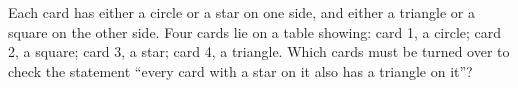 Each card has either a circle or a star on one side, and either a triangle or a square on the other side. Four cards lie on a table showing: card 1, a circle; card 2, a square; card 3, a star; card 4, a triangle. Which cards must be turned over to check the statement ``every card with a star on it also has a triangle on it''?
